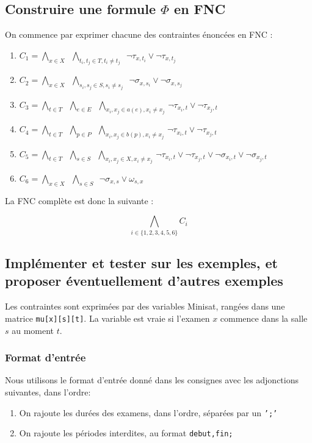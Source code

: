 \documentclass[a4paper]{article}
\begin{document}
\subsection{Construire une formule $\Phi$ en FNC}
On commence par exprimer chacune des contraintes énoncées en FNC :

\begin{enumerate}
  \item $ C_1 = \bigwedge\limits_{x \in X} \,\,\,
          \bigwedge\limits_{t_i, t_j \in T, t_i \neq t_j} \,\,\,
          \lnot \tau_{x,t_i} \lor \lnot \tau_{x,t_j}$
  \item $ C_2 = \bigwedge\limits_{x \in X} \,\,\,
          \bigwedge\limits_{s_i, s_j \in S, s_i \neq s_j} \,\,\,
          \lnot \sigma_{x,s_i} \lor \lnot \sigma_{x,s_j}$
  \item $ C_3 = \bigwedge\limits_{t \in T} \,\,\,
          \bigwedge\limits_{e \in E} \,\,\,
          \bigwedge\limits_{x_i, x_j \in a(e), x_i \neq x_j} \,
          \lnot \tau_{x_i,t} \lor \lnot \tau_{x_j,t}$
  \item $ C_4 = \bigwedge\limits_{t \in T} \,\,\,
          \bigwedge\limits_{p \in P} \,\,\,
          \bigwedge\limits_{x_i, x_j \in b(p), x_i \neq x_j} \,
          \lnot \tau_{x_i,t} \lor \lnot \tau_{x_j,t}$
  \item $ C_5 = \bigwedge\limits_{t \in T} \,\,\,
          \bigwedge\limits_{s \in S} \,\,\,
          \bigwedge\limits_{x_i, x_j \in X, x_i \neq x_j} \,
          \lnot \tau_{x_i,t} \lor \lnot \tau_{x_j,t} \lor \lnot \sigma_{x_i,t} \lor \lnot \sigma_{x_j,t}$
  \item $ C_6 = \bigwedge\limits_{x \in X} \,\,\,
          \bigwedge\limits_{s \in S} \,\,\,
          \lnot \sigma_{x,s} \lor \omega_{s,x}$
\end{enumerate}

La FNC complète est donc la suivante :

$$ \bigwedge\limits_{i \in \{1, 2, 3, 4, 5, 6\}} C_i$$

\subsection{Implémenter et tester sur les exemples, et proposer éventuellement d’autres exemples}
Les contraintes sont exprimées par des variables Minisat, rangées dans une matrice
\texttt{mu[x][s][t]}. La variable est vraie si l'examen $x$ commence dans la salle
$s$ au moment $t$. 

\subsubsection{Format d'entrée}
Nous utilisons le format d'entrée donné dans les consignes avec les adjonctions suivantes, dans l'ordre:
\begin{enumerate}
  \item On rajoute les durées des examens, dans l'ordre, séparées par un \texttt{';'}
  \item On rajoute les périodes interdites, au format \texttt{debut,fin;}
\end{enumerate}
\end{document}
